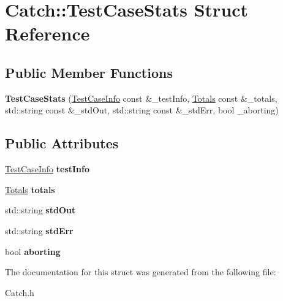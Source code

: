 \hypertarget{struct_catch_1_1_test_case_stats}{\section{Catch\-:\-:Test\-Case\-Stats Struct Reference}
\label{struct_catch_1_1_test_case_stats}
}
\subsection*{Public Member Functions}
\begin{DoxyCompactItemize}
\item 
\hypertarget{struct_catch_1_1_test_case_stats_ac5000f8751634dc39e48b87bd7e79970}{{\bfseries Test\-Case\-Stats} (\hyperlink{struct_catch_1_1_test_case_info}{Test\-Case\-Info} const \&\-\_\-test\-Info, \hyperlink{struct_catch_1_1_totals}{Totals} const \&\-\_\-totals, std\-::string const \&\-\_\-std\-Out, std\-::string const \&\-\_\-std\-Err, bool \-\_\-aborting)}\label{struct_catch_1_1_test_case_stats_ac5000f8751634dc39e48b87bd7e79970}

\end{DoxyCompactItemize}
\subsection*{Public Attributes}
\begin{DoxyCompactItemize}
\item 
\hypertarget{struct_catch_1_1_test_case_stats_a6eb1ba3f940b899f7734c0f8888c0252}{\hyperlink{struct_catch_1_1_test_case_info}{Test\-Case\-Info} {\bfseries test\-Info}}\label{struct_catch_1_1_test_case_stats_a6eb1ba3f940b899f7734c0f8888c0252}

\item 
\hypertarget{struct_catch_1_1_test_case_stats_afc3947e6c6ca93cad0bdc6742c65c4a8}{\hyperlink{struct_catch_1_1_totals}{Totals} {\bfseries totals}}\label{struct_catch_1_1_test_case_stats_afc3947e6c6ca93cad0bdc6742c65c4a8}

\item 
\hypertarget{struct_catch_1_1_test_case_stats_acab436aeefce581c52d0e195872484f7}{std\-::string {\bfseries std\-Out}}\label{struct_catch_1_1_test_case_stats_acab436aeefce581c52d0e195872484f7}

\item 
\hypertarget{struct_catch_1_1_test_case_stats_a84851abaa94a6b09664517a4919fa8ac}{std\-::string {\bfseries std\-Err}}\label{struct_catch_1_1_test_case_stats_a84851abaa94a6b09664517a4919fa8ac}

\item 
\hypertarget{struct_catch_1_1_test_case_stats_a0b61bf85883cde3d2c294a685aed49e7}{bool {\bfseries aborting}}\label{struct_catch_1_1_test_case_stats_a0b61bf85883cde3d2c294a685aed49e7}

\end{DoxyCompactItemize}


The documentation for this struct was generated from the following file\-:\begin{DoxyCompactItemize}
\item 
Catch.\-h\end{DoxyCompactItemize}
